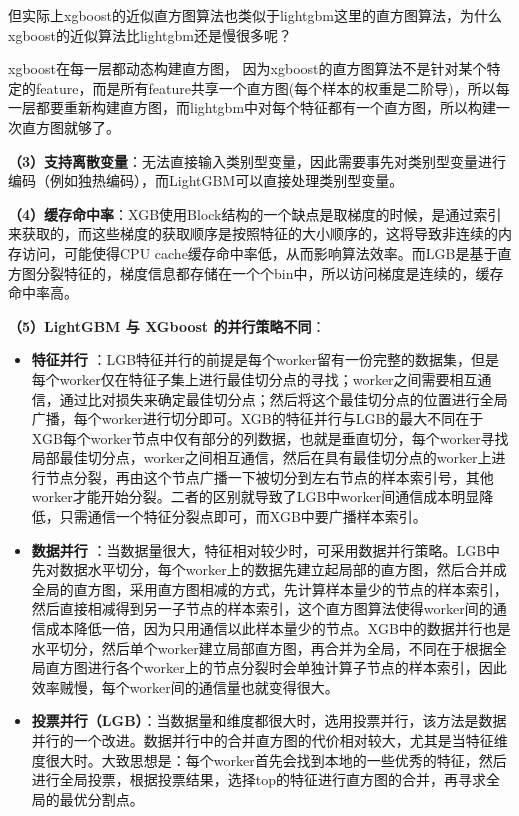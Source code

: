 \documentclass[12pt]{article}
\begin{document}
\begin{framed}
但实际上xgboost的近似直方图算法也类似于lightgbm这里的直方图算法，为什么xgboost的近似算法比lightgbm还是慢很多呢？

xgboost在每一层都动态构建直方图， 因为xgboost的直方图算法不是针对某个特定的feature，而是所有feature共享一个直方图(每个样本的权重是二阶导)，所以每一层都要重新构建直方图，而lightgbm中对每个特征都有一个直方图，所以构建一次直方图就够了。
\end{framed}

\textbf{（3）支持离散变量}：无法直接输入类别型变量，因此需要事先对类别型变量进行编码（例如独热编码），而LightGBM可以直接处理类别型变量。

\textbf{（4）缓存命中率}：XGB使用Block结构的一个缺点是取梯度的时候，是通过索引来获取的，而这些梯度的获取顺序是按照特征的大小顺序的，这将导致非连续的内存访问，可能使得CPU cache缓存命中率低，从而影响算法效率。而LGB是基于直方图分裂特征的，梯度信息都存储在一个个bin中，所以访问梯度是连续的，缓存命中率高。

\textbf{（5）LightGBM 与 XGboost 的并行策略不同}：
\begin{itemize}
\setlength{\itemsep}{0pt}
\setlength{\parsep}{0pt}
\setlength{\parskip}{0pt}
    \item \textbf{特征并行} ：LGB特征并行的前提是每个worker留有一份完整的数据集，但是每个worker仅在特征子集上进行最佳切分点的寻找；worker之间需要相互通信，通过比对损失来确定最佳切分点；然后将这个最佳切分点的位置进行全局广播，每个worker进行切分即可。XGB的特征并行与LGB的最大不同在于XGB每个worker节点中仅有部分的列数据，也就是垂直切分，每个worker寻找局部最佳切分点，worker之间相互通信，然后在具有最佳切分点的worker上进行节点分裂，再由这个节点广播一下被切分到左右节点的样本索引号，其他worker才能开始分裂。二者的区别就导致了LGB中worker间通信成本明显降低，只需通信一个特征分裂点即可，而XGB中要广播样本索引。
    
    \item \textbf{数据并行 }：当数据量很大，特征相对较少时，可采用数据并行策略。LGB中先对数据水平切分，每个worker上的数据先建立起局部的直方图，然后合并成全局的直方图，采用直方图相减的方式，先计算样本量少的节点的样本索引，然后直接相减得到另一子节点的样本索引，这个直方图算法使得worker间的通信成本降低一倍，因为只用通信以此样本量少的节点。XGB中的数据并行也是水平切分，然后单个worker建立局部直方图，再合并为全局，不同在于根据全局直方图进行各个worker上的节点分裂时会单独计算子节点的样本索引，因此效率贼慢，每个worker间的通信量也就变得很大。
    
    \item \textbf{投票并行（LGB）}：当数据量和维度都很大时，选用投票并行，该方法是数据并行的一个改进。数据并行中的合并直方图的代价相对较大，尤其是当特征维度很大时。大致思想是：每个worker首先会找到本地的一些优秀的特征，然后进行全局投票，根据投票结果，选择top的特征进行直方图的合并，再寻求全局的最优分割点。
\end{itemize}






\end{document}
